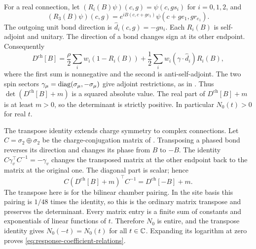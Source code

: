 For a real connection, let
$(R_i(B)\psi)(c,g)=\psi(c,gs_i)$ for $i=0,1,2$, and
\[
 (R_3(B)\psi)(c,g)=e^{iB(c,c+ge_1)}
                         \psi(c+ge_1,gr_{e_1}).
\]
The outgoing unit bond direction is $\widehat d_i(c,g)=-gn_i$.
Each $R_i(B)$ is self-adjoint and unitary. The direction of a bond changes
sign at its other endpoint. Consequently
\[
 D^{\mathrm{ch}}[B]=\frac{\rho}{2}
       \sum_iw_i(1-R_i(B))+\frac12
       \sum_iw_i(\gamma\cdot\widehat d_i)R_i(B),
\]
where the first sum is nonnegative and the second is anti-self-adjoint.
The two spin sectors $\gamma_\mu=\operatorname{diag}(\sigma_\mu,-\sigma_\mu)$
give adjoint restrictions, as in \cite[(17)]{ChamberLattice}. Thus
$\det(D^{\mathrm{ch}}[B]+m)$ is a squared absolute value.
The real part of $D^{\mathrm{ch}}[B]+m$ is at least $m>0$,
so the determinant is strictly
positive. In particular $N_0(t)>0$ for real $t$.

The transpose identity extends charge symmetry to complex connections.
Let $C=\sigma_2\oplus\sigma_2$ be the charge-conjugation matrix of
\cite[\S3.1]{ChamberLattice}. Transposing a phased bond reverses its
direction and changes its phase from $B$ to $-B$.
The identity $C\gamma_v^\top C^{-1}=-\gamma_v$ changes the transposed
matrix at the other endpoint back to the matrix at the original one.
The diagonal part is scalar; hence
\[
 C(D^{\mathrm{ch}}[B]+m)^\top C^{-1}
                   =D^{\mathrm{ch}}[-B]+m.
\]
The transpose here is for the bilinear chamber pairing. In the site
basis this pairing is $1/48$ times the identity, so this is the
ordinary matrix transpose and preserves the determinant. Every matrix
entry is a finite sum of constants and exponentials of linear
functions of $t$. Therefore $N_0$ is entire, and the transpose
identity gives $N_0(-t)=N_0(t)$ for all $t\in\mathbb C$.
Expanding its logarithm at zero proves
\eqref{eq:response-coefficient-relations}.

